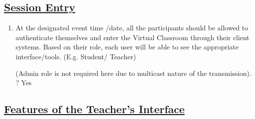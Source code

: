 \documentclass{article}
\begin{document}
\subsection*{\underline{Session Entry}}
\begin{enumerate} 
\item[{}{}]

At the designated event time /date, all the participants should be allowed to authenticate themselves and enter the Virtual Classroom through their client systems. Based on their role, each user will be able to see the appropriate interface/tools. (E.g. Student/ Teacher)  

(Admin role is not required here due to multicast nature of the transmission). ? Yes  
\end{enumerate}
\subsection*{\underline{Features of the Teacher's Interface}}
\end{document}
